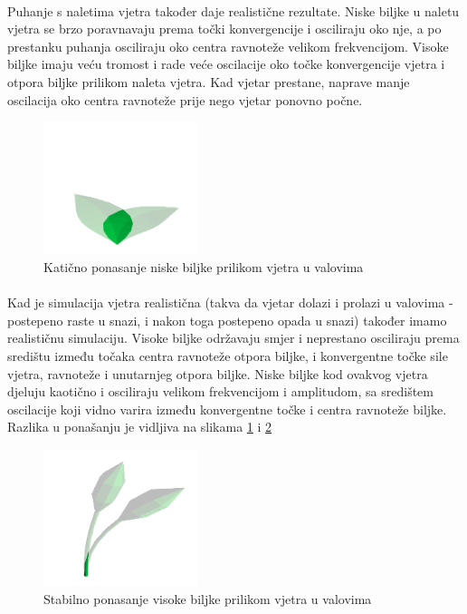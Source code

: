 \documentclass[times, utf8, diplomski]{fer}
\begin{document}
\paragraph{}
Puhanje s naletima vjetra također daje realistične rezultate. Niske biljke u 
naletu vjetra se brzo poravnavaju prema točki konvergencije i osciliraju oko 
nje, a po prestanku puhanja osciliraju oko centra ravnoteže velikom 
frekvencijom. Visoke biljke imaju veću tromost i rade veće oscilacije oko točke
konvergencije vjetra i otpora biljke prilikom naleta vjetra. Kad vjetar 
prestane, naprave manje oscilacija oko centra ravnoteže prije nego vjetar 
ponovno počne.
\begin{figure}[h]
	\centering
	\includegraphics[width=0.4\textwidth]{img/52-1}
	\caption{Katično ponasanje niske biljke prilikom vjetra u valovima}
	\label{fig:52-1}
\end{figure}
\paragraph{}
Kad je simulacija vjetra realistična (takva da vjetar dolazi i prolazi u 
valovima - postepeno raste u snazi, i nakon toga postepeno opada u snazi) 
također imamo realističnu simulaciju. Visoke biljke održavaju smjer i neprestano 
osciliraju prema središtu između točaka centra ravnoteže otpora biljke, i 
konvergentne točke sile vjetra, ravnoteže i unutarnjeg otpora biljke. Niske 
biljke kod ovakvog vjetra djeluju kaotično i osciliraju velikom frekvencijom i 
amplitudom, sa središtem oscilacije koji vidno varira između konvergentne točke 
i centra ravnoteže biljke. Razlika u ponašanju je vidljiva na slikama \ref{fig:52-1} i \ref{fig:52-2}
\begin{figure}[h]
	\centering
	\includegraphics[width=0.4\textwidth]{img/52-2}
	\caption{Stabilno ponasanje visoke biljke prilikom vjetra u valovima}
	\label{fig:52-2}
\end{figure}
\end{document}
